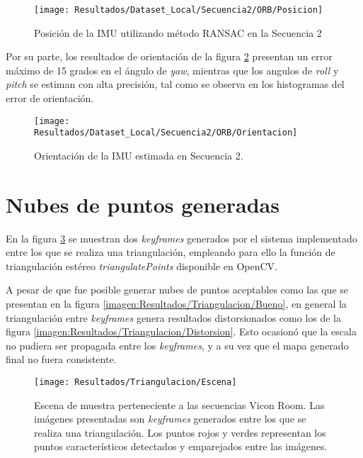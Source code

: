\begin{figure}[H]
	\centering
	\texttt{[image: Resultados/Dataset\_Local/Secuencia2/ORB/Posicion]}
	\caption{Posición de la IMU utilizando método RANSAC en la Secuencia 2}
	\label{imagen:Resultados/Dataset_Local/Secuencia2/ORB/Posicion}
\end{figure}

Por su parte, los resultados de orientación de la figura \ref{imagen:Resultados/Dataset_Local/Secuencia2/ORB/Orientacion} presentan un error máximo de 15 grados en el ángulo de \textit{yaw}, mientras que los angulos de \textit{roll} y \textit{pitch} se estiman con alta precisión, tal como se observa en los histogramas del error de orientación.

\begin{figure}[H]
	\centering
	\texttt{[image: Resultados/Dataset\_Local/Secuencia2/ORB/Orientacion]}
	\caption[Orientación de la IMU estimada en la Secuencia 2]{Orientación de la IMU estimada en Secuencia 2.}
	\label{imagen:Resultados/Dataset_Local/Secuencia2/ORB/Orientacion}
\end{figure}


\section{Nubes de puntos generadas}

En la figura \ref{imagen:Resultados/Triangulacion/Escena} se muestran dos \textit{keyframes} generados por el sistema implementado entre los que se realiza una triangulación, empleando para ello la función de triangulación estéreo \textit{ triangulatePoints} disponible en OpenCV.

A pesar de que fue posible generar nubes de puntos aceptables  como las que se presentan en la figura \ref{imagen:Resultados/Triangulacion/Bueno}, en general la triangulación entre \textit{keyframes} genera resultados distorsionados como los de la figura \ref{imagen:Resultados/Triangulacion/Distorsion}. Esto ocasionó que la escala no pudiera ser propagada entre los \textit{keyframes},  y a su vez que el mapa generado final no fuera consistente. 

\begin{figure}[H]
	\centering
	\texttt{[image: Resultados/Triangulacion/Escena]}
	\caption[Escena de muestra perteneciente a las secuencias Vicon Room]{Escena de muestra perteneciente a las secuencias Vicon Room. Las imágenes presentadas son \textit{keyframes} generados entre los que se realiza una triangulación. Los puntos rojos y verdes representan los puntos característicos detectados y emparejados entre las imágenes.}
	\label{imagen:Resultados/Triangulacion/Escena}
\end{figure}

